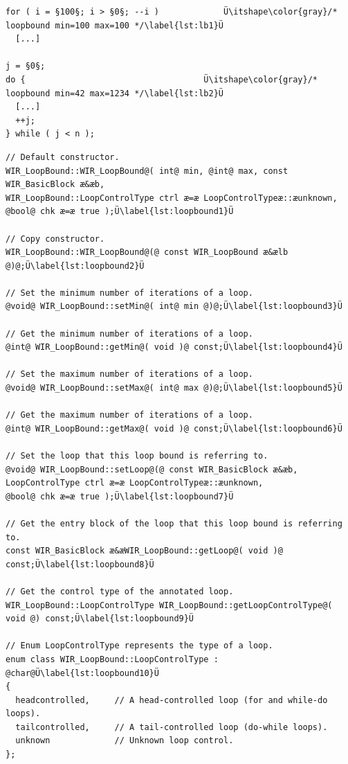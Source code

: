 \begin{lstlisting}[style=code,float=!h]
for ( i = §100§; i > §0§; --i )             Ü\itshape\color{gray}/* loopbound min=100 max=100 */\label{lst:lb1}Ü
  [...]

j = §0§;
do {                                    Ü\itshape\color{gray}/* loopbound min=42 max=1234 */\label{lst:lb2}Ü
  [...]
  ++j;
} while ( j < n );
\end{lstlisting}

\begin{lstlisting}[style=code,float=!b,caption={Public Interface of Class \texttt{WIR\_LoopBound}},label=lst:loopbound]
// Default constructor.
WIR_LoopBound::WIR_LoopBound@( int@ min, @int@ max, const WIR_BasicBlock æ&æb,                                                                WIR_LoopBound::LoopControlType ctrl æ=æ LoopControlTypeæ::æunknown,                                           @bool@ chk æ=æ true );Ü\label{lst:loopbound1}Ü

// Copy constructor.
WIR_LoopBound::WIR_LoopBound@(@ const WIR_LoopBound æ&ælb @)@;Ü\label{lst:loopbound2}Ü

// Set the minimum number of iterations of a loop.
@void@ WIR_LoopBound::setMin@( int@ min @)@;Ü\label{lst:loopbound3}Ü

// Get the minimum number of iterations of a loop.
@int@ WIR_LoopBound::getMin@( void )@ const;Ü\label{lst:loopbound4}Ü

// Set the maximum number of iterations of a loop.
@void@ WIR_LoopBound::setMax@( int@ max @)@;Ü\label{lst:loopbound5}Ü

// Get the maximum number of iterations of a loop.
@int@ WIR_LoopBound::getMax@( void )@ const;Ü\label{lst:loopbound6}Ü

// Set the loop that this loop bound is referring to.
@void@ WIR_LoopBound::setLoop@(@ const WIR_BasicBlock æ&æb, LoopControlType ctrl æ=æ LoopControlTypeæ::æunknown,                                 @bool@ chk æ=æ true );Ü\label{lst:loopbound7}Ü

// Get the entry block of the loop that this loop bound is referring to.
const WIR_BasicBlock æ&æWIR_LoopBound::getLoop@( void )@ const;Ü\label{lst:loopbound8}Ü

// Get the control type of the annotated loop.
WIR_LoopBound::LoopControlType WIR_LoopBound::getLoopControlType@( void @) const;Ü\label{lst:loopbound9}Ü

// Enum LoopControlType represents the type of a loop.
enum class WIR_LoopBound::LoopControlType : @char@Ü\label{lst:loopbound10}Ü
{
  headcontrolled,     // A head-controlled loop (for and while-do loops).
  tailcontrolled,     // A tail-controlled loop (do-while loops).
  unknown             // Unknown loop control.
};
\end{lstlisting}

